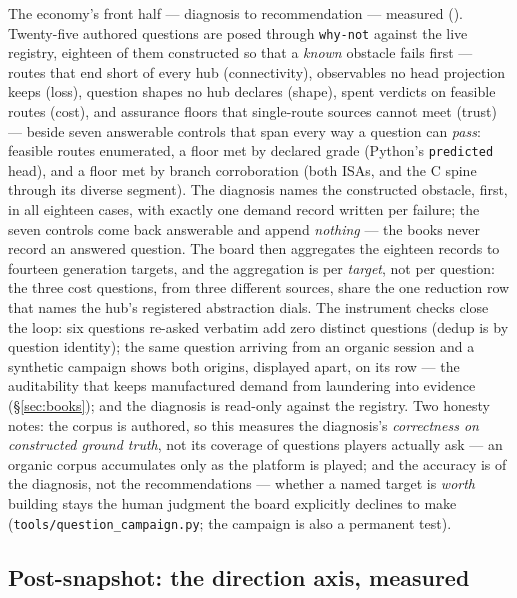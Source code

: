 The economy's front half --- diagnosis to recommendation --- measured
(). Twenty-five authored questions are posed
through \texttt{why-not} against the live registry, eighteen of them
constructed so that a \emph{known} obstacle fails first --- routes
that end short of every hub (connectivity), observables no head
projection keeps (loss), question shapes no hub declares (shape),
spent verdicts on feasible routes (cost), and assurance floors that
single-route sources cannot meet (trust) --- beside seven answerable
controls that span every way a question can \emph{pass}: feasible
routes enumerated, a floor met by declared grade
(Python's \texttt{predicted} head), and a floor met by branch
corroboration (both ISAs, and the C spine through its diverse
segment). The diagnosis names the constructed obstacle, first, in all
eighteen cases, with exactly one demand record written per failure;
the seven controls come back answerable and append \emph{nothing} ---
the books never record an answered question. The board then aggregates
the eighteen records to fourteen generation targets, and the
aggregation is per \emph{target}, not per question: the three cost
questions, from three different sources, share the one reduction row
that names the hub's registered abstraction dials. The instrument
checks close the loop: six questions re-asked verbatim add zero
distinct questions (dedup is by question identity); the same question
arriving from an organic session and a synthetic campaign shows both
origins, displayed apart, on its row --- the auditability that keeps
manufactured demand from laundering into evidence (\S\ref{sec:books});
and the diagnosis is read-only against the registry. Two honesty
notes: the corpus is authored, so this measures the diagnosis's
\emph{correctness on constructed ground truth}, not its coverage of
questions players actually ask --- an organic corpus accumulates only
as the platform is played; and the accuracy is of the diagnosis, not
the recommendations --- whether a named target is \emph{worth}
building stays the human judgment the board explicitly declines to
make (\texttt{tools/question\_campaign.py}; the campaign is also a
permanent test).

\subsection{Post-snapshot: the direction axis, measured}
\label{sec:eval-abstraction}



